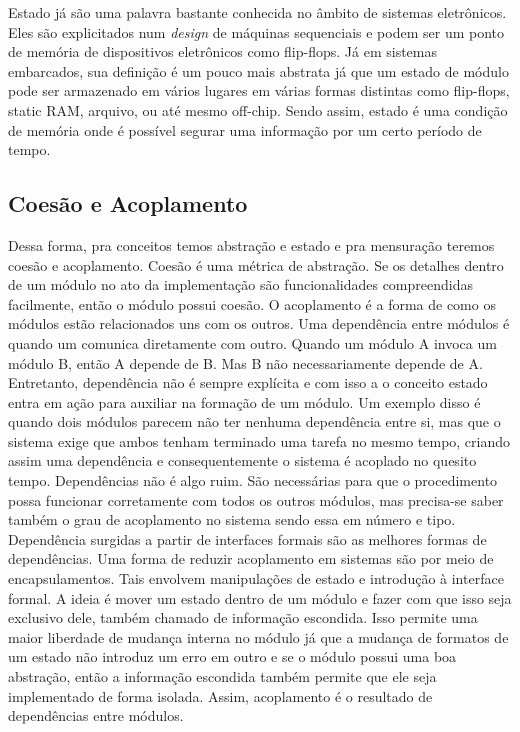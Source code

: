 Estado já são uma palavra bastante conhecida no âmbito de sistemas eletrônicos. Eles são explicitados num \textit{design} de máquinas sequenciais e podem ser um ponto de memória de dispositivos eletrônicos como flip-flops. Já em sistemas embarcados, sua definição é um pouco mais abstrata já que um estado de módulo pode ser armazenado em vários lugares em várias formas distintas como flip-flops, static RAM, arquivo, ou até mesmo off-chip. Sendo assim, estado é uma condição de memória onde é possível segurar uma informação por um certo período de tempo.





\subsection{Coesão e Acoplamento}



Dessa forma, pra conceitos temos abstração e estado e pra mensuração teremos coesão e acoplamento. Coesão é uma métrica de abstração. Se os detalhes dentro de um módulo no ato da implementação são funcionalidades compreendidas facilmente, então o módulo possui coesão. O acoplamento é a forma de como os módulos estão relacionados uns com os outros. Uma dependência entre módulos é quando um comunica diretamente com outro. Quando um módulo A invoca um módulo B, então A depende de B. Mas B não necessariamente depende de A. Entretanto, dependência não é sempre explícita e com isso a o conceito estado entra em ação para auxiliar na formação de um módulo. Um exemplo disso é quando dois módulos parecem não ter nenhuma dependência entre si, mas que o sistema exige que ambos tenham terminado uma tarefa no mesmo tempo, criando assim uma dependência e consequentemente o sistema é acoplado no quesito tempo. Dependências não é algo ruim. São necessárias para que o procedimento possa funcionar corretamente com todos os outros módulos, mas precisa-se saber também o grau de acoplamento no sistema sendo essa em número e tipo. Dependência surgidas a partir de interfaces formais são as melhores formas de dependências. Uma forma de reduzir acoplamento em sistemas são por meio de encapsulamentos. Tais envolvem manipulações de estado e introdução à interface formal. A ideia é mover um estado dentro de um módulo e fazer com que isso seja exclusivo dele, também chamado de informação escondida. Isso permite uma maior liberdade de mudança interna no módulo já que a mudança de formatos de um estado não introduz um erro em outro e se o módulo possui uma boa abstração, então a informação escondida também permite que ele seja implementado de forma isolada. Assim, acoplamento é o resultado de dependências entre módulos.

